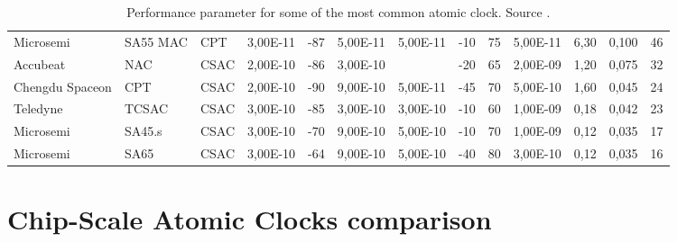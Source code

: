 \begin{table}[H]
\begin{tabular}{ll|lllllllllll}
        Microsemi       & SA55 MAC         & CPT           & 3,00E-11      & -87                    & 5,00E-11       & 5,00E-11         & -10                    & 75                     & 5,00E-11        & 6,30           & 0,100           & 46                      \\
        Accubeat        & NAC              & CSAC          & 2,00E-10      & -86                    & 3,00E-10       & ~                & -20                    & 65                     & 2,00E-09        & 1,20           & 0,075           & 32                      \\
        Chengdu Spaceon & CPT              & CSAC          & 2,00E-10      & -90                    & 9,00E-10       & 5,00E-11         & -45                    & 70                     & 5,00E-10        & 1,60           & 0,045           & 24                      \\
        Teledyne        & TCSAC            & CSAC          & 3,00E-10      & -85                    & 3,00E-10       & 3,00E-10         & -10                    & 60                     & 1,00E-09        & 0,18           & 0,042           & 23                      \\
        Microsemi       & SA45.s           & CSAC          & 3,00E-10      & -70                    & 9,00E-10       & 5,00E-10         & -10                    & 70                     & 1,00E-09        & 0,12           & 0,035           & 17                      \\
        Microsemi       & SA65             & CSAC          & 3,00E-10      & -64                    & 9,00E-10       & 5,00E-10         & -40                    & 80                     & 3,00E-10        & 0,12           & 0,035           & 16                      \\
        \hline
    \end{tabular}
    \caption{Performance parameter for some of the most common atomic clock. Source \cite{Marlow-Scherer}.}
\end{table}

\eject
\restoregeometry
\pdfpagewidth=210mm
\pdfpageheight=297mm


\section{Chip-Scale Atomic Clocks comparison}
\label{appendix:csac}

